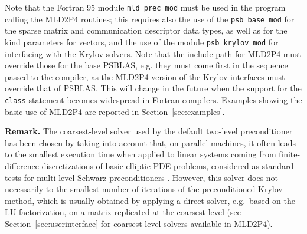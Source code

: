 Note that the Fortran 95 module \verb|mld_prec_mod| must be used in the program
calling the MLD2P4 routines; this requires also  the use of the
\verb|psb_base_mod| for the sparse matrix and communication descriptor
data types, as well as for the kind parameters for vectors, and the
use of the module \verb|psb_krylov_mod| for interfacing with the
Krylov solvers. Note that the include path for MLD2P4 must override
those for the base PSBLAS, e.g. they must come first in the sequence
passed to the compiler, as the MLD2P4 version of the Krylov interfaces
must override that of PSBLAS. This will change in the future when the
support for the \verb|class| statement becomes widespread in Fortran
compilers. 
Examples showing the basic use of MLD2P4 are reported in Section~\ref{sec:examples}.

\noindent
\textbf{Remark.} The coarsest-level solver used by the default two-level
preconditioner has been chosen by taking into account that, on parallel
machines, it often leads to the smallest execution time when applied to
linear systems coming from finite-difference discretizations of basic
elliptic PDE problems, considered as standard tests for multi-level Schwarz
preconditioners \cite{aaecc_07,apnum_07}. However, this solver does
not necessarily  to the smallest number of iterations of the
preconditioned Krylov method, which is usually obtained by applying a
direct solver, e.g.\ based on the LU factorization, on a matrix
replicated at the coarsest level (see Section~\ref{sec:userinterface}
for coarsest-level solvers available in MLD2P4). 

